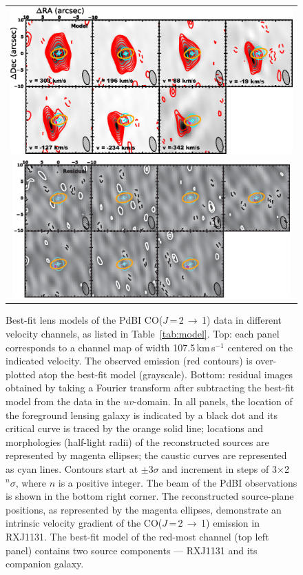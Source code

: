 \documentclass[]{emulateapj}
\newcommand{\rarr}{$\rightarrow$}
\newcommand{\bco}{\mbox{CO($J$\,=\,2\,\rarr\,1)}\xspace}
\newcommand{\kms}{\mbox{km\,s$^{-1}$}\xspace}
\newcommand{\Tab}[1]{Table~\ref{tab:#1}}
\begin{document}
\begin{figure}[tbph]
\centering
\begin{tabular}{c}
\includegraphics[trim=0 0 0 0, clip, width=1.0\textwidth]{f6a.eps} \\
\includegraphics[width=0.98\textwidth]{f6b.eps}
\end{tabular}
\caption{Best-fit lens models of the PdBI \bco data in different velocity channels, as listed in \Tab{model}.
Top: each panel corresponds to a channel map of width 107.5\,\kms centered on the indicated velocity.
The observed emission (red contours) is over-plotted atop the best-fit model (grayscale).
Bottom: residual images obtained by
taking a Fourier transform after subtracting the best-fit model from the
data in the $uv$-domain.
In all panels, the location of the foreground lensing galaxy is indicated by a black dot and
its critical curve is traced by the orange solid line; locations and
morphologies (half-light radii) of the reconstructed sources are
represented by magenta ellipses; the caustic curves are represented as cyan lines.
Contours start
at $\pm$3$\sigma$ and increment in steps of 3$\times$2$^n\sigma$,
where $n$ is a positive integer.
The beam of the PdBI observations is shown in the bottom right corner.
The reconstructed source-plane positions, as represented by the magenta ellipses, demonstrate an intrinsic velocity gradient of the \bco emission in RXJ1131.
The best-fit model of the red-most channel (top left panel) contains two source components --- RXJ1131 and its companion galaxy.
\label{fig:model}}
\end{figure}
\end{document}
